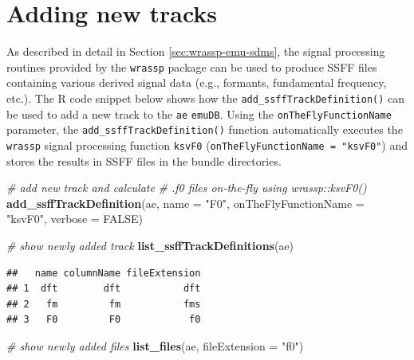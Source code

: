 \documentclass[]{book}
\newenvironment{Shaded}{\begin{snugshade}}{\end{snugshade}}
\newcommand{\CommentTok}[1]{\textcolor[rgb]{0.56,0.35,0.01}{\textit{#1}}}
\newcommand{\DataTypeTok}[1]{\textcolor[rgb]{0.13,0.29,0.53}{#1}}
\newcommand{\KeywordTok}[1]{\textcolor[rgb]{0.13,0.29,0.53}{\textbf{#1}}}
\newcommand{\NormalTok}[1]{#1}
\newcommand{\OtherTok}[1]{\textcolor[rgb]{0.56,0.35,0.01}{#1}}
\newcommand{\StringTok}[1]{\textcolor[rgb]{0.31,0.60,0.02}{#1}}
\begin{document}
\hypertarget{adding-new-tracks}{%
\section{Adding new tracks}\label{adding-new-tracks}}

As described in detail in Section \ref{sec:wrassp-emu-sdms}, the signal processing routines provided by the \texttt{wrassp} package can be used to produce SSFF files containing various derived signal data (e.g., formants, fundamental frequency, etc.). The R code snippet below shows how the \texttt{add\_ssffTrackDefinition()} can be used to add a new track to the \texttt{ae} \texttt{emuDB}. Using the \texttt{onTheFlyFunctionName} parameter, the \texttt{add\_ssffTrackDefinition()} function automatically executes the \texttt{wrassp} signal processing function \texttt{ksvF0} (\texttt{onTheFlyFunctionName\ =\ "ksvF0"}) and stores the results in SSFF files in the bundle directories.

\begin{Shaded}
\begin{Highlighting}[]
\CommentTok{# add new track and calculate}
\CommentTok{# .f0 files on-the-fly using wrassp::ksvF0()}
\KeywordTok{add_ssffTrackDefinition}\NormalTok{(ae,}
                        \DataTypeTok{name =} \StringTok{"F0"}\NormalTok{,}
                        \DataTypeTok{onTheFlyFunctionName =} \StringTok{"ksvF0"}\NormalTok{,}
                        \DataTypeTok{verbose =} \OtherTok{FALSE}\NormalTok{)}

\CommentTok{# show newly added track}
\KeywordTok{list_ssffTrackDefinitions}\NormalTok{(ae)}
\end{Highlighting}
\end{Shaded}

\begin{verbatim}
##   name columnName fileExtension
## 1  dft        dft           dft
## 2   fm         fm           fms
## 3   F0         F0            f0
\end{verbatim}

\begin{Shaded}
\begin{Highlighting}[]
\CommentTok{# show newly added files}
\KeywordTok{list_files}\NormalTok{(ae, }\DataTypeTok{fileExtension =} \StringTok{"f0"}\NormalTok{)}
\end{Highlighting}
\end{Shaded}
\end{document}
